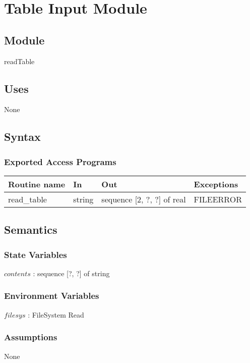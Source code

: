 \documentclass[12pt,fleqn]{article}
\begin{document}

\newpage

\section* {Table Input Module}

\subsection*{Module}

readTable

\subsection* {Uses}

None

\subsection* {Syntax}

\subsubsection* {Exported Access Programs}

\begin{tabular}{| l | l | l | l |}
\hline
\textbf{Routine name} & \textbf{In} & \textbf{Out} & \textbf{Exceptions}\\
\hline
read\_table & string & sequence [2, ?, ?] of real & FILEERROR\\
\hline

\end{tabular}

\subsection* {Semantics}

\subsubsection* {State Variables}
$contents$ : sequence [?, ?] of string

\subsubsection* {Environment Variables}
$filesys$ : FileSystem Read

\subsubsection* {Assumptions}
None
\end{document}
